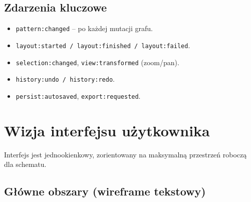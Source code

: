 \documentclass[a4paper,11pt]{article}
\begin{document}

\subsection{Zdarzenia kluczowe}

\begin{itemize}
  \item \texttt{pattern:changed} -- po każdej mutacji grafu.
  \item \texttt{layout:started / layout:finished / layout:failed}.
  \item \texttt{selection:changed}, \texttt{view:transformed} (zoom/pan).
  \item \texttt{history:undo / history:redo}.
  \item \texttt{persist:autosaved}, \texttt{export:requested}.
\end{itemize}

\pagebreak

\section{Wizja interfejsu użytkownika}

Interfejs jest jednookienkowy, zorientowany na maksymalną przestrzeń roboczą dla schematu.

\subsection{Główne obszary (wireframe tekstowy)}
\end{document}
